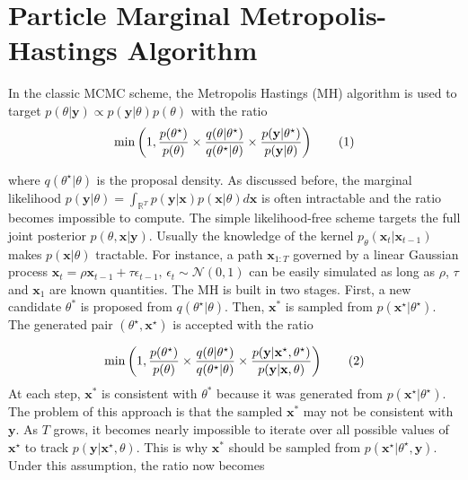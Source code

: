 \documentclass[11pt,a4,twosided,singlespacing,titlepagenumber=on]{scrreprt}
\numberwithin{equation}{chapter} %
\theoremstyle{remark}
\newcommand{\matr}[1]{\mathbf{#1}}
\newcommand\numberthis{\addtocounter{equation}{1}\tag{\theequation}}
\begin{document}
\section{Particle Marginal Metropolis-Hastings Algorithm}
\label{section:mcmc_pmmh}

In the classic MCMC scheme, the Metropolis Hastings (MH) algorithm is used to target $p(\theta| \matr{y}) \propto p(\matr{y}|\theta)p(\theta)$ with the ratio
\begin{align*}
\min \left( 1, \frac{p(\theta^\star)}{p(\theta)} \times  \frac{q(\theta|\theta^\star)}{q(\theta^\star|\theta)} \times \frac{p({\matr{y}}|\theta^\star)}{p({\matr{y}}|\theta)} \right) \numberthis \label{classic_mcmc_target}
\end{align*}


where $q(\theta^\star|\theta)$ is the proposal density. As discussed before, the marginal likelihood $p(\matr{y}|\theta) = \int_{\mathbb{R}^T} p(\matr{y}|\matr{x})p(\matr{x}|\theta) d\matr{x}$ is often intractable and the ratio becomes impossible to compute. The simple likelihood-free scheme targets the full joint posterior $p(\theta,\matr{x}|\matr{y})$. Usually the knowledge of the kernel $p_\theta(\matr{x}_t|\matr{x}_{t-1})$ makes $p(\matr{x}|\theta)$ tractable. For instance, a path $\matr{x}_{1:T}$ governed by a linear Gaussian process $\matr{x}_t = \rho \matr{x}_{t-1} + \tau \epsilon_{t-1} \text{, } \epsilon_t \sim \mathcal{N}(0,1)$ can be easily simulated as long as $\rho$, $\tau$ and $\matr{x}_1$ are known quantities. The MH is built in two stages. First, a new candidate $\theta^*$ is proposed from $q(\theta^\star|\theta)$. Then, $\matr{x}^*$ is sampled from $p(\matr{x}^\star|\theta^\star)$. The generated pair $(\theta^\star,\matr{x}^\star)$ is accepted with the ratio

\begin{align*}
\min \left( 1, \frac{p(\theta^\star)}{p(\theta)} \times  \frac{q(\theta|\theta^\star)}{q(\theta^\star|\theta)} \times \frac{p(\matr{y}|{\matr{x}}^\star,\theta^\star)}{p(\matr{y}|{\matr{x}},\theta)} \right) \numberthis
\end{align*}
At each step, $\matr{x}^*$ is consistent with $\theta^*$ because it was generated from $p(\matr{x}^\star|\theta^\star)$. The problem of this approach is that the sampled $\matr{x}^*$ may not be consistent with $\matr{y}$. As $T$ grows, it becomes nearly impossible to iterate over all possible values of $\matr{x}^\star$ to track $p(\matr{y}|\matr{x}^\star,\theta)$. This is why $\matr{x}^*$ should be sampled from $p(\matr{x}^\star|\theta^\star,\matr{y})$. Under this assumption, the ratio now becomes
\end{document}
